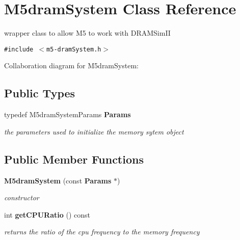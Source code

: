 \section{M5dramSystem Class Reference}
\label{class_m5dram_system}
wrapper class to allow M5 to work with DRAMSimII  


{\tt \#include $<$m5-dramSystem.h$>$}

Collaboration diagram for M5dramSystem:\subsection*{Public Types}
\begin{CompactItemize}
\item 
typedef M5dramSystemParams {\bf Params}\label{class_m5dram_system_bc049789b7ba009ac06888952383d456}

\begin{CompactList}\small\item\em the parameters used to initialize the memory sytem object \item\end{CompactList}\end{CompactItemize}
\subsection*{Public Member Functions}
\begin{CompactItemize}
\item 
{\bf M5dramSystem} (const {\bf Params} $\ast$)\label{class_m5dram_system_84fc057ba92f2b4259bb6e48dfda6e67}

\begin{CompactList}\small\item\em constructor \item\end{CompactList}\item 
int {\bf getCPURatio} () const \label{class_m5dram_system_1525d7f1a5251189661baf1ba2ae67c6}

\begin{CompactList}\small\item\em returns the ratio of the cpu frequency to the memory frequency \item\end{CompactList}\end{CompactItemize}
